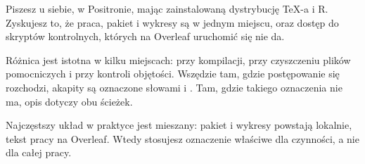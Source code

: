  Piszesz u siebie, w Positronie, mając zainstalowaną
dystrybucję \TeX-a i R. Zyskujesz to, że praca, pakiet i wykresy są w jednym miejscu,
oraz dostęp do skryptów kontrolnych, których na Overleaf uruchomić się nie da.

Różnica jest istotna w kilku miejscach: przy kompilacji, przy czyszczeniu plików
pomocniczych i przy kontroli objętości. Wszędzie tam, gdzie postępowanie się rozchodzi,
akapity są oznaczone słowami  i .
Tam, gdzie takiego oznaczenia nie ma, opis dotyczy obu ścieżek.

Najczęstszy układ w praktyce jest mieszany: pakiet i wykresy powstają lokalnie,
tekst pracy na Overleaf. Wtedy stosujesz oznaczenie właściwe dla czynności, a nie
dla całej pracy.
